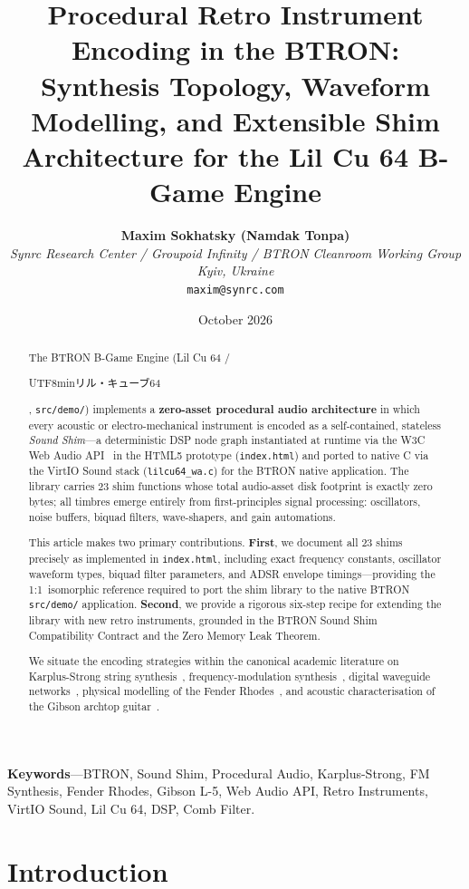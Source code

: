\documentclass[10pt,journal,compsoc,twocolumn]{article}
\title{\LARGE \textbf{Procedural Retro Instrument Encoding in the BTRON:\\
Synthesis Topology, Waveform Modelling, and Extensible Shim Architecture for the Lil Cu 64 B-Game Engine}}
\author{
    \textbf{Maxim Sokhatsky (Namdak Tonpa)}\\[0.3em]
    \small \textit{Synrc Research Center / Groupoid Infinity / BTRON Cleanroom Working Group}\\
    \small \textit{Kyiv, Ukraine}\\
    \small \texttt{maxim@synrc.com}
}
\date{October 2026}
\newcommand{\ja}[1]{\begin{CJK*}{UTF8}{min}#1\end{CJK*}}
\begin{document}
\maketitle

\begin{abstract}
The BTRON B-Game Engine (Lil Cu 64 / \ja{リル・キューブ64}, \texttt{src/demo/}) implements a
\textbf{zero-asset procedural audio architecture} in which every acoustic or
electro-mechanical instrument is encoded as a self-contained, stateless
\emph{Sound Shim}---a deterministic DSP node graph instantiated at runtime via
the W3C Web Audio API~\cite{webaudio2021spec} in the HTML5 prototype
(\texttt{index.html}) and ported to native C via the VirtIO Sound stack
(\texttt{lilcu64\_wa.c}) for the BTRON native application.
The library carries 23 shim functions whose total audio-asset disk footprint is
exactly zero bytes; all timbres emerge entirely from first-principles signal
processing: oscillators, noise buffers, biquad filters, wave-shapers, and
gain automations.

This article makes two primary contributions.
\textbf{First}, we document all 23 shims precisely as implemented in
\texttt{index.html}, including exact frequency constants, oscillator waveform
types, biquad filter parameters, and ADSR envelope timings---providing the
1:1~isomorphic reference required to port the shim library to the native BTRON
\texttt{src/demo/} application.
\textbf{Second}, we provide a rigorous six-step recipe for extending the library
with new retro instruments, grounded in the BTRON Sound Shim Compatibility
Contract and the Zero Memory Leak Theorem.

We situate the encoding strategies within the canonical academic literature on
Karplus-Strong string synthesis~\cite{karplus1983digital},
frequency-modulation synthesis~\cite{chowning1973synthesis},
digital waveguide networks~\cite{smith1992physical},
physical modelling of the Fender Rhodes~\cite{bank2010parametric,petersen2011rhodes},
and acoustic characterisation of the Gibson archtop
guitar~\cite{Richardson1982guitar,Elejabarrieta2002guitar,Caldersmith1978guitar}.
\end{abstract}

\noindent\textbf{\small Keywords}---BTRON, Sound Shim, Procedural Audio, Karplus-Strong,
FM Synthesis, Fender Rhodes, Gibson L-5, Web Audio API, Retro Instruments,
VirtIO Sound, Lil Cu 64, DSP, Comb Filter.

\section{Introduction}
\label{sec:intro}
\end{document}
